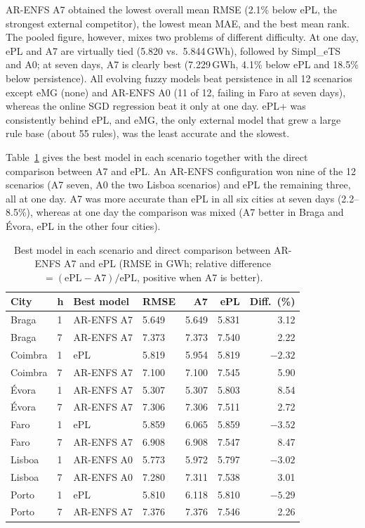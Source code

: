 \documentclass[preprint,12pt]{elsarticle}
\begin{document}
AR-ENFS A7 obtained the lowest overall mean RMSE (2.1\% below ePL, the strongest external competitor), the lowest mean MAE, and the best mean rank. The pooled figure, however, mixes two problems of different difficulty. At one day, ePL and A7 are virtually tied (5.820 vs.\ 5.844\,GWh), followed by Simpl\_eTS and A0; at seven days, A7 is clearly best (7.229\,GWh, 4.1\% below ePL and 18.5\% below persistence). All evolving fuzzy models beat persistence in all 12 scenarios except eMG (none) and AR-ENFS A0 (11 of 12, failing in Faro at seven days), whereas the online SGD regression beat it only at one day. ePL+ was consistently behind ePL, and eMG, the only external model that grew a large rule base (about 55 rules), was the least accurate and the slowest.

Table~\ref{tab:benchmark_winners} gives the best model in each scenario together with the direct comparison between A7 and ePL. An AR-ENFS configuration won nine of the 12 scenarios (A7 seven, A0 the two Lisboa scenarios) and ePL the remaining three, all at one day. A7 was more accurate than ePL in all six cities at seven days (2.2--8.5\%), whereas at one day the comparison was mixed (A7 better in Braga and \'Evora, ePL in the other four cities).

\begin{table}[!t]
\caption{Best model in each scenario and direct comparison between AR-ENFS A7 and ePL (RMSE in GWh; relative difference $=(\mathrm{ePL}-\mathrm{A7})/\mathrm{ePL}$, positive when A7 is better).}
\label{tab:benchmark_winners}
\centering
\small
\begin{tabular}{llllrrr}
\toprule
\textbf{City} & \textbf{h} & \textbf{Best model} & \textbf{RMSE} & \textbf{A7} & \textbf{ePL} & \textbf{Diff.\ (\%)} \\
\midrule
Braga & 1 & AR-ENFS A7 & 5.649 & 5.649 & 5.831 & 3.12 \\
Braga & 7 & AR-ENFS A7 & 7.373 & 7.373 & 7.540 & 2.22 \\
Coimbra & 1 & ePL & 5.819 & 5.954 & 5.819 & $-2.32$ \\
Coimbra & 7 & AR-ENFS A7 & 7.100 & 7.100 & 7.545 & 5.90 \\
\'Evora & 1 & AR-ENFS A7 & 5.307 & 5.307 & 5.803 & 8.54 \\
\'Evora & 7 & AR-ENFS A7 & 7.306 & 7.306 & 7.511 & 2.72 \\
Faro & 1 & ePL & 5.859 & 6.065 & 5.859 & $-3.52$ \\
Faro & 7 & AR-ENFS A7 & 6.908 & 6.908 & 7.547 & 8.47 \\
Lisboa & 1 & AR-ENFS A0 & 5.773 & 5.972 & 5.797 & $-3.02$ \\
Lisboa & 7 & AR-ENFS A0 & 7.280 & 7.311 & 7.538 & 3.01 \\
Porto & 1 & ePL & 5.810 & 6.118 & 5.810 & $-5.29$ \\
Porto & 7 & AR-ENFS A7 & 7.376 & 7.376 & 7.546 & 2.26 \\
\bottomrule
\end{tabular}
\end{table}
\end{document}
